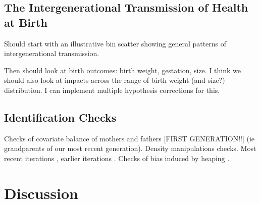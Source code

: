 \documentclass[11pt]{article}
\begin{document}
\begin{spacing}{1.5}
  
  \subsection{The Intergenerational Transmission of Health at Birth}

  Should start with an illustrative bin scatter \citep{Cattaneoetal2019} showing general patterns of intergenerational transmission.

  Then should look at birth outcomes: birth weight, gestation, size.  I think we should also look at impacts across the range of birth weight (and size?) distribution.  I can implement multiple hypothesis corrections for this.

  \subsection{Identification Checks}
  Checks of covariate balance of mothers and fathers [FIRST GENERATION!!]  (ie grandparents of our most recent generation).  Density manipulations checks.  Most recent iterations \citep{Cattaneoetal2020}, earlier iterations \citet{McCrary2008}.  Checks of bias induced by heaping \citep{Barrecaetal2016}.

  

  
  \clearpage
  \section{Discussion}

  \clearpage
  \end{spacing}
  
  
\end{document}
